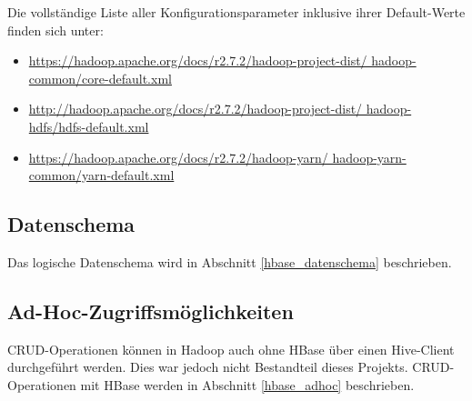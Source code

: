Die vollständige Liste aller Konfigurationsparameter inklusive ihrer Default-Werte finden sich unter:

\begin{itemize}
	\item \url{https://hadoop.apache.org/docs/r2.7.2/hadoop-project-dist/
	hadoop-common/core-default.xml}
	\item \url{http://hadoop.apache.org/docs/r2.7.2/hadoop-project-dist/
	hadoop-hdfs/hdfs-default.xml}
	\item \url{https://hadoop.apache.org/docs/r2.7.2/hadoop-yarn/
	hadoop-yarn-common/yarn-default.xml}
\end{itemize}


\subsection{Datenschema}
Das logische Datenschema wird in Abschnitt \ref{hbase_datenschema}  beschrieben.


\subsection{Ad-Hoc-Zugriffsmöglichkeiten}
\ac{CRUD}-Operationen können in Hadoop auch ohne HBase über einen Hive-Client durchgeführt werden. Dies war jedoch nicht Bestandteil dieses Projekts. CRUD-Operationen mit HBase werden in Abschnitt \ref{hbase_adhoc} beschrieben.
